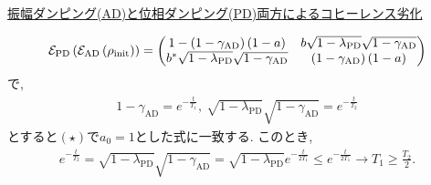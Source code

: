 \begin{ex}
    \underline{振幅ダンピング(AD)と位相ダンピング(PD)両方によるコヒーレンス劣化} \ \par
    \begin{align*}
        \mathcal{E}_\mathrm{PD}
        \left(
        \mathcal{E}_\mathrm{AD}\left( \rho_\mathrm{init} \right)
        \right)
        =
        \begin{pmatrix}
            1 - \left( 1 - \gamma_\mathrm{AD}\right)\left(1-a\right)        & b \sqrt{1 - \lambda_\mathrm{PD}} \sqrt{1 - \gamma_\mathrm{AD}} \\
            b^* \sqrt{1 - \lambda_\mathrm{PD}}\sqrt{1 - \gamma_\mathrm{AD}} & \left( 1 - \gamma_\mathrm{AD}\right)\left(1-a\right)           \\
        \end{pmatrix}
    \end{align*}
    で,
    \begin{align*}
        1-\gamma_\mathrm{AD} = e^{- \frac{t}{T_1}}
        , \ \sqrt{1- \lambda_\mathrm{PD}} \sqrt{1-\gamma_\mathrm{AD}} = e^{- \frac{t}{T_2}}
    \end{align*}
    とすると$(\star)$で$a_0 = 1$とした式に一致する. このとき,
    \begin{align*}
        e^{- \frac{t}{T_2}}
        = \sqrt{1- \lambda_\mathrm{PD}} \sqrt{1-\gamma_\mathrm{AD}}
        =  \sqrt{1- \lambda_\mathrm{PD}} e^{- \frac{t}{2 T_1}} \leq e^{-\frac{t}{2T_1}}
        \to
        T_1 \geq \frac{T_2}{2}.
    \end{align*}
\end{ex}

